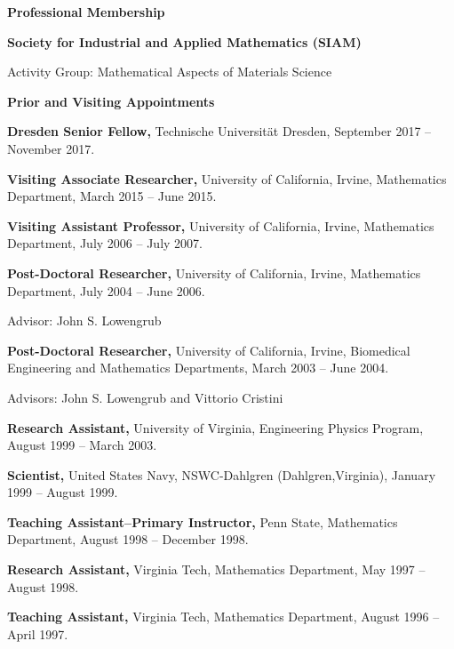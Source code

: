 \documentclass[11pt]{letter}
\begin{document}
	\smallskip
  
{\LARGE\bf  Professional Membership}
    \begin{description}
    \item
 \textbf{Society for Industrial and Applied Mathematics (SIAM)}
    \begin{description}
    \item
Activity Group: Mathematical Aspects of Materials Science
    \end{description}
    \end{description}
	
	\smallskip

{\LARGE\bf  Prior and Visiting Appointments}
    \begin{description}    \item 
\textbf{Dresden Senior Fellow,} Technische Universit\"{a}t Dresden, September 2017 -- November 2017.
    \item 
\textbf{Visiting Associate Researcher,} University of California, Irvine,
Mathematics Department, March 2015 -- June 2015. 
    \item 
\textbf{Visiting Assistant Professor,} University of California, Irvine,
Mathematics Department, July 2006 -- July 2007.
    \item 
\textbf{Post-Doctoral Researcher,} University of California, Irvine, Mathematics Department, July 2004 -- June 2006.
    \begin{description}
    \item
Advisor: John S. Lowengrub
    \end{description}
    	\item 
\textbf{Post-Doctoral Researcher,} University of California, Irvine, Biomedical Engineering and Mathematics Departments, March 2003 -- June 2004.
    \begin{description}
    \item
Advisors: John S. Lowengrub and Vittorio Cristini
    \end{description}
	\item
\textbf{Research Assistant,} University of Virginia, Engineering Physics Program, August 1999 -- March 2003.
    \item
\textbf{Scientist,} United States Navy, NSWC-Dahlgren (Dahlgren,Virginia), January 1999 -- August 1999.
    \item
\textbf{Teaching Assistant--Primary Instructor,} Penn State, Mathematics Department, August 1998 -- December 1998.
    \item
\textbf{Research Assistant,} Virginia Tech, Mathematics Department, May 1997 -- August 1998.
    \item
\textbf{Teaching Assistant,} Virginia Tech, Mathematics Department, August 1996 -- April 1997.
    \end{description}
\end{document}
